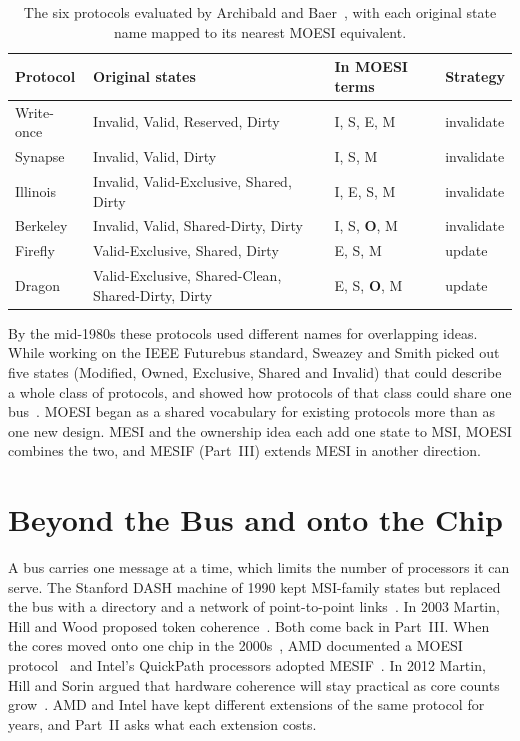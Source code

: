 \begin{table}[htbp]
\centering
\caption{The six protocols evaluated by Archibald and
Baer~\cite{archibald1986evaluation}, with each original state name mapped to
its nearest MOESI equivalent.}
\label{tab:hist-protocols}
\small
\begin{tabular}{@{}l l l l@{}}
\toprule
Protocol & Original states & In MOESI terms & Strategy \\
\midrule
Write-once & Invalid, Valid, Reserved, Dirty & I, S, E, M & invalidate \\
Synapse    & Invalid, Valid, Dirty & I, S, M & invalidate \\
Illinois   & Invalid, Valid-Exclusive, Shared, Dirty & I, E, S, M & invalidate \\
Berkeley   & Invalid, Valid, Shared-Dirty, Dirty & I, S, \textbf{O}, M & invalidate \\
Firefly    & Valid-Exclusive, Shared, Dirty & E, S, M & update \\
Dragon     & Valid-Exclusive, Shared-Clean, Shared-Dirty, Dirty & E, S, \textbf{O}, M & update \\
\bottomrule
\end{tabular}
\end{table}

By the mid-1980s these protocols used different names for overlapping ideas.
While working on the IEEE Futurebus standard, Sweazey and Smith picked out five
states (Modified, Owned, Exclusive, Shared and Invalid) that could describe a
whole class of protocols, and showed how protocols of that class could share one
bus~\cite{sweazey1986moesi}. MOESI began as a shared vocabulary for existing
protocols more than as one new design. MESI and the ownership idea each add one
state to MSI, MOESI combines the two, and MESIF (Part~III) extends MESI in another
direction.

\section{Beyond the Bus and onto the Chip}
\label{sec:hist-scaling}
\label{sec:hist-multicore}
%

A bus carries one message at a time, which limits the number of processors it can
serve. The Stanford DASH machine of 1990 kept MSI-family states but replaced the
bus with a directory and a network of point-to-point links~\cite{lenoski1990dash}.
In 2003 Martin, Hill and Wood proposed token coherence~\cite{martin2003token}.
Both come back in Part~III. When the cores moved onto one chip in the
2000s~\cite[\S12.1]{sarangi2025basic}, AMD documented a MOESI
protocol~\cite{amd64vol2} and Intel's QuickPath processors adopted
MESIF~\cite{goodman2009mesif}. In 2012 Martin, Hill and Sorin argued that hardware
coherence will stay practical as core counts grow~\cite{martin2012here}. AMD and
Intel have kept different extensions of the same protocol for years, and Part~II
asks what each extension costs.
